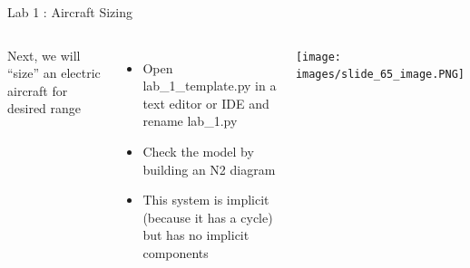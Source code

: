 \documentclass[aspectratio=169, usenames,dvipsnames, 14pt]{beamer}
\begin{document}

\begin{frame}{Lab 1 : Aircraft Sizing}
    \begin{columns}
            Next, we will “size” an electric aircraft for desired range
            \vspace{0.25cm}
            
            \begin{itemize}
                \item \footnotesize Open lab\_1\_template.py in a text editor or IDE and rename lab\_1.py
                \item \footnotesize Check the model by building an N2 diagram
                \item \footnotesize This system is implicit (because it has a cycle) but has no implicit components
            \end{itemize}

            \texttt{[image: images/slide\_65\_image.PNG]}
    \end{columns}
\end{frame}
    
\end{document}
